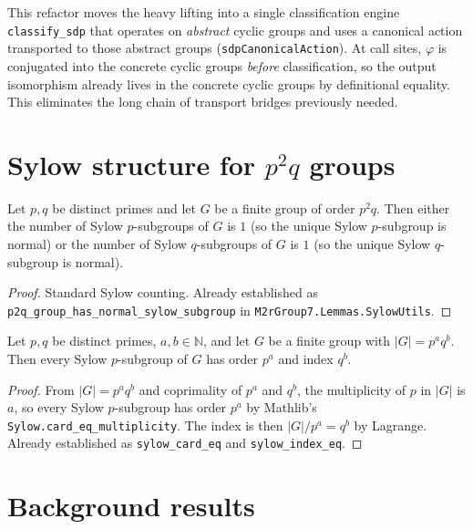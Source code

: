 This refactor moves the heavy lifting into a single classification engine
\texttt{classify\_sdp} that operates on \emph{abstract} cyclic groups and uses
a canonical action transported to those abstract groups
(\texttt{sdpCanonicalAction}). At call sites, $\varphi$ is conjugated into the
concrete cyclic groups \emph{before} classification, so the output isomorphism
already lives in the concrete cyclic groups by definitional equality. This
eliminates the long chain of transport bridges previously needed.

\section{Sylow structure for $p^2 q$ groups}

\begin{lemma}
    \label{lem:p2q-normal-sylow}
    Let $p, q$ be distinct primes and let $G$ be a finite group of order
    $p^2 q$. Then either the number of Sylow $p$-subgroups of $G$ is $1$ (so
    the unique Sylow $p$-subgroup is normal) or the number of Sylow
    $q$-subgroups of $G$ is $1$ (so the unique Sylow $q$-subgroup is normal).
\end{lemma}
\begin{proof}
    Standard Sylow counting. Already established as
    \texttt{p2q\_group\_has\_normal\_sylow\_subgroup} in
    \texttt{M2rGroup7.Lemmas.SylowUtils}.
\end{proof}

\begin{lemma}
    \label{lem:sylow-card-index}
    Let $p, q$ be distinct primes, $a, b \in \mathbb{N}$, and let $G$ be a
    finite group with $|G| = p^a q^b$. Then every Sylow $p$-subgroup of $G$
    has order $p^a$ and index $q^b$.
\end{lemma}
\begin{proof}
    From $|G| = p^a q^b$ and coprimality of $p^a$ and $q^b$, the multiplicity
    of $p$ in $|G|$ is $a$, so every Sylow $p$-subgroup has order $p^a$ by
    Mathlib's \texttt{Sylow.card\_eq\_multiplicity}. The index is then
    $|G|/p^a = q^b$ by Lagrange. Already established as
    \texttt{sylow\_card\_eq} and \texttt{sylow\_index\_eq}.
\end{proof}

\section{Background results}

